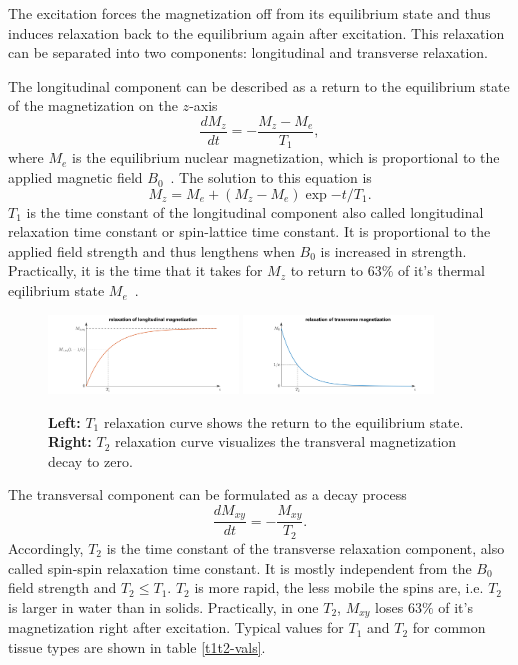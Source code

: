 The excitation forces the magnetization off from its equilibrium state and thus induces relaxation back to the equilibrium again after excitation.
This relaxation can be separated into two components: longitudinal and transverse relaxation.

The longitudinal component can be described as a return to the equilibrium state of the magnetization on the $z$-axis
\[ \frac{d M_z}{d t} = - \frac{M_z - M_e}{T_1}, \]
where $M_e$ is the equilibrium nuclear magnetization, which is proportional to the applied magnetic field $B_0$~\autocite{nishimura}.
The solution to this equation is
\[  M_z = M_e + (M_z - M_e) \exp{-t / T_1}. \]
$T_1$ is the time constant of the longitudinal component also called longitudinal relaxation time constant or spin-lattice time constant.
It is proportional to the applied field strength and thus lengthens when $B_0$ is increased in strength.
Practically, it is the time that it takes for $M_z$ to return to $63 \%$ of it's thermal eqilibrium state $M_e$~\autocite{relaxation, lauterbur}.
   \begin{figure}[h]
      \begin{center}
         \includegraphics[keepaspectratio, width=0.45\textwidth]{img/t1.png}
         \includegraphics[keepaspectratio, width=0.45\textwidth]{img/t2.png}
      \end{center}
      \caption{
         \textbf{Left:} $T_1$ relaxation curve shows the return to the equilibrium state.
         \textbf{Right:} $T_2$ relaxation curve visualizes the transveral magnetization decay to zero.
      }
      \label{relaxations}
   \end{figure}

The transversal component can be formulated as a decay process
\[ \frac{d M_{xy}}{d t} = - \frac{M_{xy}}{T_2}. \]
Accordingly, $T_2$ is the time constant of the transverse relaxation component, also called spin-spin relaxation time constant.
It is mostly independent from the $B_0$ field strength and $T_2 \leq T_1$.
$T_2$ is more rapid, the less mobile the spins are, i.e. $T_2$ is larger in water than in solids.
Practically, in one $T_2$, $M_{xy}$ loses $63 \%$ of it's magnetization right after excitation.
Typical values for $T_1$ and $T_2$ for common tissue types are shown in table \ref{t1t2-vals}.

